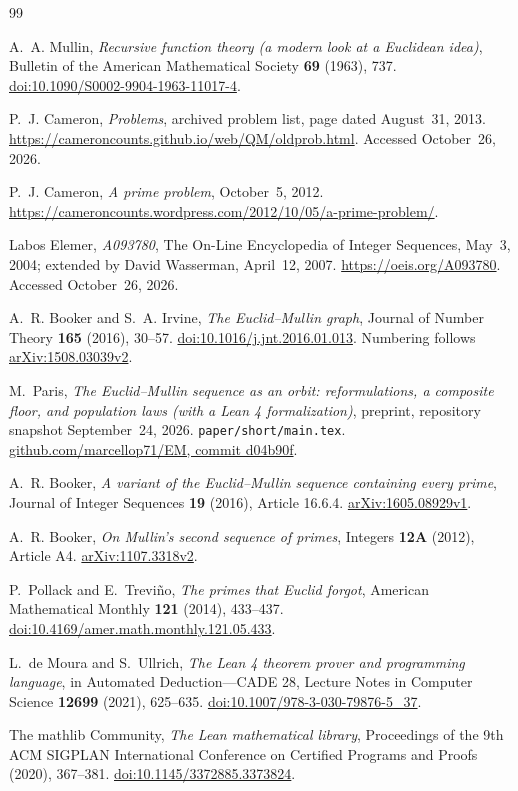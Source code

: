 \documentclass[11pt]{article}
\begin{document}
\begin{thebibliography}{99}
\raggedright
{}
A.~A. Mullin, \emph{Recursive function theory (a modern look at a
Euclidean idea)}, Bulletin of the American Mathematical Society
\textbf{69} (1963), 737.
\href{https://doi.org/10.1090/S0002-9904-1963-11017-4}{doi:10.1090/S0002-9904-1963-11017-4}.

P.~J. Cameron, \emph{Problems}, archived problem list, page dated August~31, 2013.
\url{https://cameroncounts.github.io/web/QM/oldprob.html}.
Accessed October~26, 2026.

P.~J. Cameron, \emph{A prime problem}, October~5, 2012.
\url{https://cameroncounts.wordpress.com/2012/10/05/a-prime-problem/}.

Labos Elemer, \emph{A093780}, The On-Line Encyclopedia of Integer
Sequences, May~3, 2004; extended by David Wasserman, April~12, 2007.
\url{https://oeis.org/A093780}.
Accessed October~26, 2026.

A.~R. Booker and S.~A. Irvine,
\emph{The Euclid--Mullin graph},
Journal of Number Theory \textbf{165} (2016), 30--57.
\href{https://doi.org/10.1016/j.jnt.2016.01.013}{doi:10.1016/j.jnt.2016.01.013}.
Numbering follows
\href{https://arxiv.org/abs/1508.03039v2}{arXiv:1508.03039v2}.

M.~Paris, \emph{The Euclid--Mullin sequence as an orbit: reformulations,
a composite floor, and population laws (with a Lean 4 formalization)},
preprint, repository snapshot
September~24, 2026.
\texttt{paper/short/main.tex}.
\href{https://github.com/marcellop71/EM/blob/d04b90f5d132a452e29df91ee09ea903b811ad92/paper/short/main.tex}{github.com/marcellop71/EM, commit d04b90f}.

A.~R. Booker, \emph{A variant of the Euclid--Mullin sequence containing
every prime}, Journal of Integer Sequences \textbf{19} (2016), Article 16.6.4.
\href{https://arxiv.org/abs/1605.08929v1}{arXiv:1605.08929v1}.

A.~R. Booker, \emph{On Mullin's second sequence of primes},
Integers \textbf{12A} (2012), Article A4.
\href{https://arxiv.org/abs/1107.3318v2}{arXiv:1107.3318v2}.

P.~Pollack and E.~Trevi\~no, \emph{The primes that Euclid forgot},
American Mathematical Monthly \textbf{121} (2014), 433--437.
\href{https://doi.org/10.4169/amer.math.monthly.121.05.433}{doi:10.4169/amer.math.monthly.121.05.433}.

L.~de Moura and S.~Ullrich, \emph{The Lean 4 theorem prover and programming
language}, in Automated Deduction---CADE 28, Lecture Notes in Computer
Science \textbf{12699} (2021), 625--635.
\href{https://doi.org/10.1007/978-3-030-79876-5_37}{doi:10.1007/978-3-030-79876-5\_37}.

The mathlib Community, \emph{The Lean mathematical library},
Proceedings of the 9th ACM SIGPLAN International Conference on Certified
Programs and Proofs (2020), 367--381.
\href{https://doi.org/10.1145/3372885.3373824}{doi:10.1145/3372885.3373824}.
\end{thebibliography}
\end{document}
